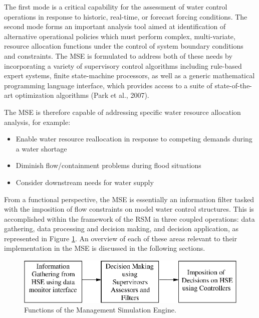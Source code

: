 The first mode is a critical capability for the assessment of water
control operations in response to historic, real-time, or forecast
forcing conditions. The second mode forms an important analysis tool
aimed at identification of alternative operational policies which must
perform complex, multi-variate, resource allocation functions under
the control of system boundary conditions and constraints. The MSE is
formulated to address both of these needs by incorporating a variety
of supervisory control algorithms including rule-based expert systems,
finite state-machine processors, as well as a generic mathematical
programming language interface, which provides access to a suite of
state-of-the-art optimization algorithms (Park et al.,
2007)\nocite{Park:2007}.

The MSE is therefore capable of addressing specific water resource
allocation analysis, for example:

\begin{itemize}
 \item Enable water resource reallocation in response to competing
   demands during a water shortage 
 \item Diminish flow/containment problems during flood situations
 \item Consider downstream needs for water supply
\end{itemize}

From a functional perspective, the MSE is essentially an information
filter tasked with the imposition of flow constraints on model water
control structures. This is accomplished within the framework of the
RSM in three coupled operations: data gathering, data processing and
decision making, and decision application, as represented in Figure
\ref{Fig:mseFunctions}. An overview of each of these areas relevant
to their implementation in the MSE is discussed in the following
sections.

\begin{figure}
 \begin{center}
  \includegraphics[scale=.85]{Graphics/mseFunctions.eps}
 \end{center}
 \caption{\label{Fig:mseFunctions} Functions of the Management Simulation Engine.}        
\end{figure}

